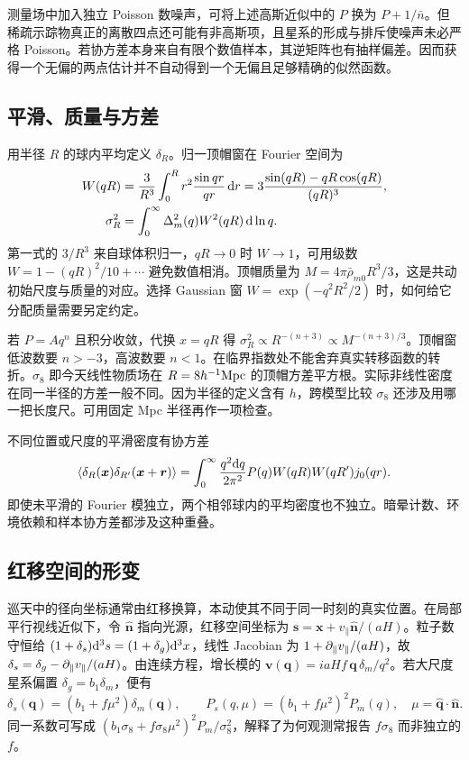 测量场中加入独立 Poisson 数噪声，可将上述高斯近似中的 $P$ 换为 $P+1/\bar n$。但稀疏示踪物真正的离散四点还可能有非高斯项，且星系的形成与排斥使噪声未必严格 Poisson。若协方差本身来自有限个数值样本，其逆矩阵也有抽样偏差。因而获得一个无偏的两点估计并不自动得到一个无偏且足够精确的似然函数。

\subsection{平滑、质量与方差}

用半径 $R$ 的球内平均定义 $\delta_R$。归一顶帽窗在 Fourier 空间为
\[
 \begin{aligned}
 W(qR)&=\frac{3}{R^3}\int_0^R r^2\frac{\sin qr}{qr}\,\dd r
       =3\frac{\sin(qR)-qR\cos(qR)}{(qR)^3},\\
 \sigma_R^2&=\int_0^\infty\Delta_m^2(q)W^2(qR)\,\dd\ln q .
 \end{aligned}
\]
第一式的 $3/R^3$ 来自球体积归一，$qR\to0$ 时 $W\to1$，可用级数 $W=1-(qR)^2/10+\cdots$ 避免数值相消。顶帽质量为 $M=4\pi\bar\rho_{m0}R^3/3$，这是共动初始尺度与质量的对应。选择 Gaussian 窗 $W=\exp(-q^2R^2/2)$ 时，如何给它分配质量需要另定约定。

若 $P=Aq^n$ 且积分收敛，代换 $x=qR$ 得 $\sigma_R^2\propto R^{-(n+3)}\propto M^{-(n+3)/3}$。顶帽窗低波数要 $n>-3$，高波数要 $n<1$。在临界指数处不能舍弃真实转移函数的转折。$\sigma_8$ 即今天线性物质场在 $R=8h^{-1}{\rm Mpc}$ 的顶帽方差平方根。实际非线性密度在同一半径的方差一般不同。因为半径的定义含有 $h$，跨模型比较 $\sigma_8$ 还涉及用哪一把长度尺。可用固定 Mpc 半径再作一项检查。

不同位置或尺度的平滑密度有协方差
\[
 \langle\delta_R(\bm x)\delta_{R'}(\bm x+\bm r)\rangle
 =\int_0^\infty\frac{q^2\dd q}{2\pi^2}P(q)W(qR)W(qR')j_0(qr).
\]
即使未平滑的 Fourier 模独立，两个相邻球内的平均密度也不独立。暗晕计数、环境依赖和样本协方差都涉及这种重叠。

\subsection{红移空间的形变}

巡天中的径向坐标通常由红移换算，本动使其不同于同一时刻的真实位置。在局部平行视线近似下，令 $\hat{\bm n}$ 指向光源，红移空间坐标为 $\bm s=\bm x+v_\parallel\hat{\bm n}/(aH)$。粒子数守恒给 $(1+\delta_s)\dd^3s=(1+\delta_g)\dd^3x$，线性 Jacobian 为 $1+\partial_\parallel v_\parallel/(aH)$，故 $\delta_s=\delta_g-\partial_\parallel v_\parallel/(aH)$。由连续方程，增长模的 $\bm v(\bm q)=iaHf\,\bm q\,\delta_m/q^2$。若大尺度星系偏置 $\delta_g=b_1\delta_m$，便有
\begin{equation}\label{eq:cosmo-kaiser}
 \delta_s(\bm q)=(b_1+f\mu^2)\delta_m(\bm q),\qquad
 P_s(q,\mu)=(b_1+f\mu^2)^2P_m(q),\quad
 \mu=\hat{\bm q}\cdot\hat{\bm n}.
\end{equation}
同一系数可写成 $(b_1\sigma_8+f\sigma_8\mu^2)^2P_m/\sigma_8^2$，解释了为何观测常报告 $f\sigma_8$ 而非独立的 $f$。

